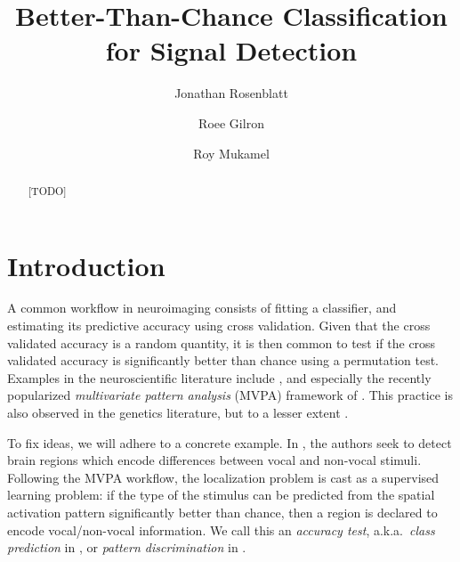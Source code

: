 \documentclass[12pt,a4paper]{article}
\author{Jonathan Rosenblatt \and Roee Gilron \and Roy Mukamel}
\title{Better-Than-Chance Classification for Signal Detection}
\begin{document}


\maketitle
\linenumbers

\begin{abstract}
[TODO]
\end{abstract}


\section{Introduction}
\label{sec:introduction}

A common workflow in neuroimaging consists of fitting a classifier, and estimating its predictive accuracy using cross validation. 
Given that the cross validated accuracy is a random quantity, it is then common to test if the cross validated accuracy is significantly better than chance using a permutation test.  
Examples in the neuroscientific literature include \citet{golland_permutation_2003,pereira_machine_2009,varoquaux_assessing_2016}, and especially the recently popularized \emph{multivariate pattern analysis} (MVPA) framework of \citet{kriegeskorte_information-based_2006}.
This practice is also observed in the genetics literature, but to a lesser extent \citep{radmacher_paradigm_2002,jiang_calculating_2008}.

To fix ideas, we will adhere to a concrete example.
In \cite{gilron_quantifying_2016}, the authors seek to detect brain regions which encode differences between vocal and non-vocal stimuli. 
Following the MVPA workflow, the localization problem is cast as a supervised learning problem: if the type of the stimulus can be predicted from the spatial activation pattern significantly better than chance, then a region is declared to encode vocal/non-vocal information. 
We call this an \emph{accuracy test}, a.k.a.\ \emph{class prediction} in \cite{simon_pitfalls_2003}, or \emph{pattern discrimination} in \cite{pereira_machine_2009}.
\end{document}

